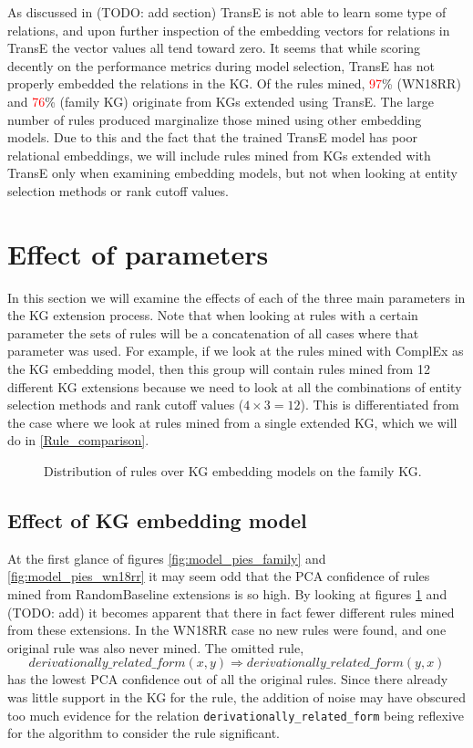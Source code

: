 As discussed in (TODO: add section) TransE is not able to learn some type of relations, and upon further inspection of the embedding vectors for relations in TransE the vector values all tend toward zero. It seems that while scoring decently on the performance metrics during model selection, TransE has not properly embedded the relations in the KG. Of the rules mined, \textcolor{red}{97}\% (WN18RR) and \textcolor{red}{76}\% (family KG) originate from KGs extended using TransE. The large number of rules produced marginalize those mined using other embedding models. Due to this and the fact that the trained TransE model has poor relational embeddings, we will include rules mined from KGs extended with TransE only when examining embedding models, but not when looking at entity selection methods or rank cutoff values.

\section{Effect of parameters}
In this section we will examine the effects of each of the three main parameters in the KG extension process. Note that when looking at rules with a certain parameter the sets of rules will be a concatenation of all cases where that parameter was used. For example, if we look at the rules mined with ComplEx as the KG embedding model, then this group will contain rules mined from 12 different KG extensions because we need to look at all the combinations of entity selection methods and rank cutoff values ($4\times3=12$). This is differentiated from the case where we look at rules mined from a single extended KG, which we will do in \cref{Rule_comparison}.

\begin{figure}
\centering
    \centering
    
    \caption{Distribution of rules over KG embedding models on the family KG.}
    \label{rule_dist_models_hbar_family}
\end{figure}


\subsection{Effect of KG embedding model}
At the first glance of figures \ref{fig:model_pies_family} and \ref{fig:model_pies_wn18rr} it may seem odd that the PCA confidence of rules mined from RandomBaseline extensions is so high. By looking at figures \ref{rule_dist_models_hbar_family} and (TODO: add) it becomes apparent that there in fact fewer different rules mined from these extensions. In the WN18RR case no new rules were found, and one original rule was also never mined. The omitted rule,
\[derivationally\_related\_form(x, y)   \Rightarrow derivationally\_related\_form(y, x)\]
has the lowest PCA confidence out of all the original rules. Since there already was little support in the KG for the rule, the addition of noise may have obscured too much evidence for the relation \texttt{derivationally\_related\_form} being reflexive for the algorithm to consider the rule significant. 

